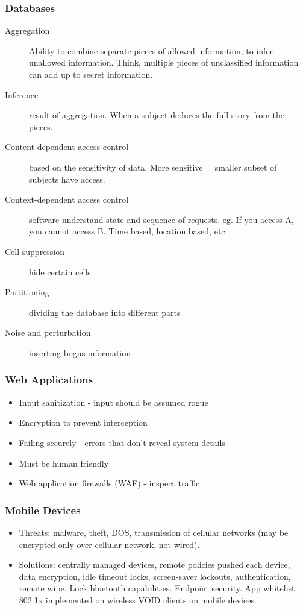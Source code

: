 \documentclass[11pt]{article}
\begin{document}
\subsubsection{Databases}
\label{sec:orgda716d5}
\begin{description}
\item[{Aggregation}] Ability to combine separate pieces of allowed information, to infer unallowed information. Think, multiple pieces of unclassified information can add up to secret information.
\item[{Inference}] result of aggregation. When a subject deduces the full story from the pieces.
\item[{Content-dependent access control}] based on the sensitivity of data. More sensitive = smaller subset of subjects have access.
\item[{Context-dependent access control}] software understand state and sequence of requests. eg. If you access A, you cannot access B. Time based, location based, etc.
\item[{Cell suppression}] hide certain cells
\item[{Partitioning}] dividing the database into different parts
\item[{Noise and perturbation}] inserting bogus information
\end{description}
\subsubsection{Web Applications}
\label{sec:orga54b3bc}
\begin{itemize}
\item Input sanitization - input should be assumed rogue
\item Encryption to prevent interception
\item Failing securely - errors that don't reveal system details
\item Must be human friendly
\item Web application firewalls (WAF) - inspect traffic
\end{itemize}
\subsubsection{Mobile Devices}
\label{sec:org4d753ee}
\begin{itemize}
\item Threats: malware, theft, DOS, transmission of cellular networks (may be encrypted only over cellular network, not wired).
\item Solutions: centrally managed devices, remote policies pushed each device, data encryption, idle timeout locks, screen-saver lockouts, authentication, remote wipe. Lock bluetooth capabilities. Endpoint security. App whitelist. 802.1x implemented on wireless VOID clients on mobile devices.
\end{itemize}
\end{document}
